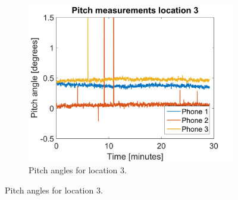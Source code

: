 \documentclass[a4paper, notitlepage]{report}
\begin{document}
\begin{figure}[H]
\begin{adjustwidth}{-1in}{-1in}
\begin{subfigure}{0.33\textwidth}
		\includegraphics[width=\textwidth]{figures/orientation/pi_loc3}
		\caption{Pitch angles for location 3.}
		\label{app:orientation_pi_loc3}
	\end{subfigure}	
	

\end{adjustwidth}
\end{figure}
\end{document}
